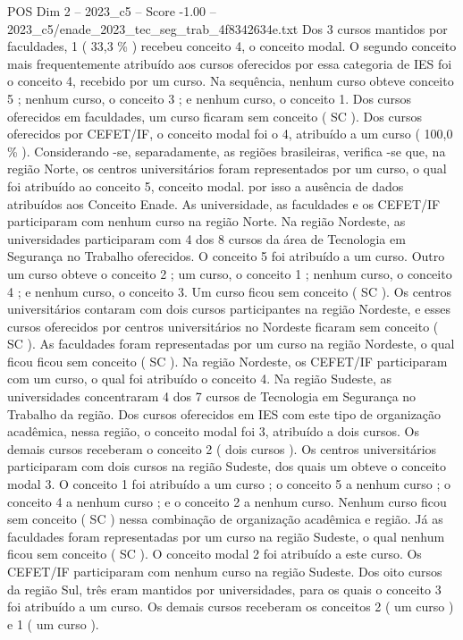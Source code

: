 \begin{textsample}{POS Dim 2 – 2023\_c5 – Score -1.00 – 2023\_c5/enade\_2023\_tec\_seg\_trab\_4f8342634e.txt}
Dos 3 cursos mantidos por faculdades, 1 ( 33,3 \% ) recebeu conceito 4, o conceito modal.
O segundo conceito mais frequentemente atribuído aos cursos oferecidos por essa categoria de IES foi o conceito 4, recebido por um curso.
Na sequência, nenhum curso obteve conceito 5 ; nenhum curso, o conceito 3 ; e nenhum curso, o conceito 1.
Dos cursos oferecidos em faculdades, um curso ficaram sem conceito ( SC ).
Dos cursos oferecidos por CEFET/IF, o conceito modal foi o 4, atribuído a um curso ( 100,0 \% ).
Considerando -se, separadamente, as regiões brasileiras, verifica -se que, na região Norte, os centros universitários foram representados por um curso, o qual foi atribuído ao conceito 5, conceito modal. por isso a ausência de dados atribuídos aos Conceito Enade.
As universidade, as faculdades e os CEFET/IF participaram com nenhum curso na região Norte.
Na região Nordeste, as universidades participaram com 4 dos 8 cursos da área de Tecnologia em Segurança no Trabalho oferecidos.
O conceito 5 foi atribuído a um curso.
Outro um curso obteve o conceito 2 ; um curso, o conceito 1 ; nenhum curso, o conceito 4 ; e nenhum curso, o conceito 3.
Um curso ficou sem conceito ( SC ).
Os centros universitários contaram com dois cursos participantes na região Nordeste, e esses cursos oferecidos por centros universitários no Nordeste ficaram sem conceito ( SC ).
As faculdades foram representadas por um curso na região Nordeste, o qual ficou ficou sem conceito ( SC ).
Na região Nordeste, os CEFET/IF participaram com um curso, o qual foi atribuído o conceito 4.
Na região Sudeste, as universidades concentraram 4 dos 7 cursos de Tecnologia em Segurança no Trabalho da região.
Dos cursos oferecidos em IES com este tipo de organização acadêmica, nessa região, o conceito modal foi 3, atribuído a dois cursos.
Os demais cursos receberam o conceito 2 ( dois cursos ).
Os centros universitários participaram com dois cursos na região Sudeste, dos quais um obteve o conceito modal 3.
O conceito 1 foi atribuído a um curso ; o conceito 5 a nenhum curso ; o conceito 4 a nenhum curso ; e o conceito 2 a nenhum curso.
Nenhum curso ficou sem conceito ( SC ) nessa combinação de organização acadêmica e região.
Já as faculdades foram representadas por um curso na região Sudeste, o qual nenhum ficou sem conceito ( SC ).
O conceito modal 2 foi atribuído a este curso.
Os CEFET/IF participaram com nenhum curso na região Sudeste.
Dos oito cursos da região Sul, três eram mantidos por universidades, para os quais o conceito 3 foi atribuído a um curso.
Os demais cursos receberam os conceitos 2 ( um curso ) e 1 ( um curso ).

\end{textsample}
